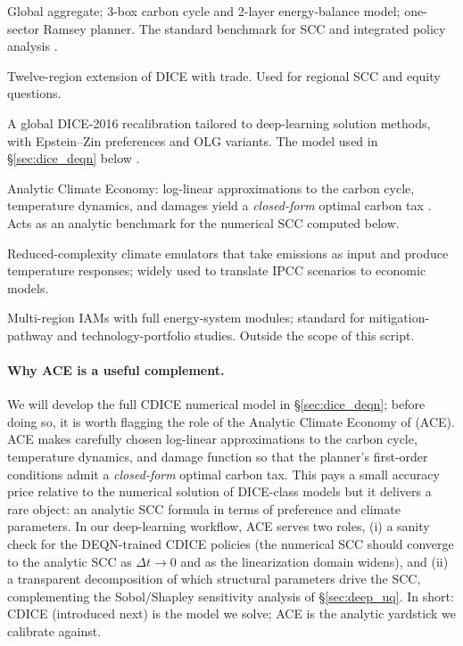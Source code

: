\documentclass[11pt,a4paper]{report}
\begin{document}
\begin{description}[itemsep=4pt, leftmargin=2.6em]
\item[DICE.]  Global aggregate; 3-box carbon cycle and 2-layer energy-balance model; one-sector Ramsey planner.  The standard benchmark for SCC and integrated policy analysis \citep{nordhausRevisitingSocialCost2017}.
\item[RICE.]  Twelve-region extension of DICE with trade.  Used for regional SCC and equity questions.
\item[CDICE.]  A global DICE-2016 recalibration tailored to deep-learning solution methods, with Epstein--Zin preferences and OLG variants.  The model used in \S\ref{sec:dice_deqn} below \citep{Folini_2021}.
\item[ACE.]  Analytic Climate Economy: log-linear approximations to the carbon cycle, temperature dynamics, and damages yield a \emph{closed-form} optimal carbon tax \citep{traeger2018ace}.  Acts as an analytic benchmark for the numerical SCC computed below.
\item[FaIR / MAGICC.]  Reduced-complexity climate emulators that take emissions as input and produce temperature responses; widely used to translate IPCC scenarios to economic models.
\item[WITCH / REMIND.]  Multi-region IAMs with full energy-system modules; standard for mitigation-pathway and technology-portfolio studies.  Outside the scope of this script.
\end{description}

\paragraph{Why ACE is a useful complement.}  We will develop the full CDICE numerical model in \S\ref{sec:dice_deqn}; before doing so, it is worth flagging the role of the Analytic Climate Economy of \citet{traeger2018ace} (\textsc{ACE}).  ACE makes carefully chosen log-linear approximations to the carbon cycle, temperature dynamics, and damage function so that the planner's first-order conditions admit a \emph{closed-form} optimal carbon tax.  This pays a small accuracy price relative to the numerical solution of DICE-class models but it delivers a rare object: an analytic SCC formula in terms of preference and climate parameters.  In our deep-learning workflow, ACE serves two roles, (i) a sanity check for the DEQN-trained CDICE policies (the numerical SCC should converge to the analytic SCC as $\Delta t \to 0$ and as the linearization domain widens), and (ii) a transparent decomposition of which structural parameters drive the SCC, complementing the Sobol/Shapley sensitivity analysis of \S\ref{sec:deep_uq}.  In short: CDICE (introduced next) is the model we solve; ACE is the analytic yardstick we calibrate against.
\end{document}
